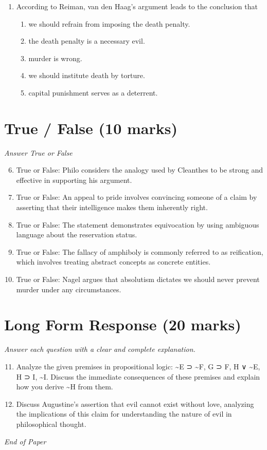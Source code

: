 \documentclass[12pt]{article}
\begin{document}
\begin{enumerate}[label=\arabic*.]
\begin{enumerate}[label=(\alph*)]
    \item ill-prepare them for the workforce.
    \item harm their ability to learn.
    \item all of the above.
\end{enumerate}
\item According to Reiman, van den Haag's argument leads to the conclusion that
\begin{enumerate}[label=(\alph*)]
    \item we should refrain from imposing the death penalty.
    \item the death penalty is a necessary evil.
    \item murder is wrong.
    \item we should institute death by torture.
    \item capital punishment serves as a deterrent.
\end{enumerate}
\end{enumerate}

\section*{True / False (10 marks)}
\textit{Answer True or False}
\begin{enumerate}[label=\arabic*.]
\setcounter{enumi}{5}
\item True or False: Philo considers the analogy used by Cleanthes to be strong and effective in supporting his argument.
\item True or False: An appeal to pride involves convincing someone of a claim by asserting that their intelligence makes them inherently right.
\item True or False: The statement demonstrates equivocation by using ambiguous language about the reservation status.
\item True or False: The fallacy of amphiboly is commonly referred to as reification, which involves treating abstract concepts as concrete entities.
\item True or False: Nagel argues that absolutism dictates we should never prevent murder under any circumstances.
\end{enumerate}

\section*{Long Form Response (20 marks)}
\textit{Answer each question with a clear and complete explanation.}
\begin{enumerate}[label=\arabic*.]
\setcounter{enumi}{10}
\item Analyze the given premises in propositional logic: \textasciitilde{}E ⊃ \textasciitilde{}F, G ⊃ F, H ∨ \textasciitilde{}E, H ⊃ I, \textasciitilde{}I. Discuss the immediate consequences of these premises and explain how you derive \textasciitilde{}H from them.
\item Discuss Augustine's assertion that evil cannot exist without love, analyzing the implications of this claim for understanding the nature of evil in philosophical thought.
\end{enumerate}

\vfill
\noindent\textit{End of Paper}
\end{document}
